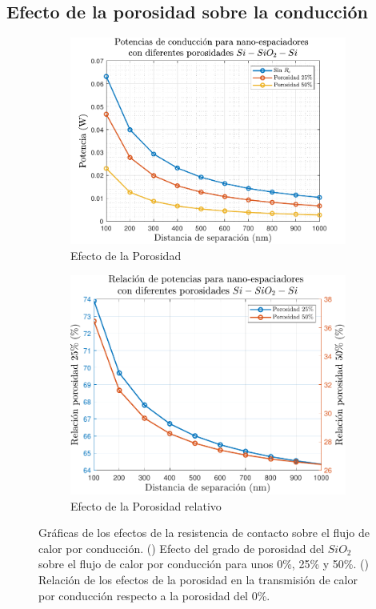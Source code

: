 \subsection{Efecto de la porosidad sobre la conducción}
\begin{figure}[H]
\centering
	\begin{subfigure}[b]{0.49\textwidth}
		\centering
		\includegraphics[width=1.0\textwidth]{figuras/Resultados/conduccion/pdf/Ppor_SiSiO2Si.pdf}
		\caption{Efecto de la Porosidad}
		\label{fig:Ppor_SiSiO2Si}
	\end{subfigure}
	\hfill
	\begin{subfigure}[b]{0.49\textwidth}
		\centering
		\includegraphics[width=1.0\textwidth]{figuras/Resultados/conduccion/pdf/relPpor_SiSiO2Si.pdf}
		\caption{Efecto de la Porosidad relativo}
		\label{fig:relPpor_SiSiO2Si}
	\end{subfigure}
	\caption[Efectos de la porosidad del nano-espaciador sobre el flujo de calor por conducción]{Gráficas de los efectos de la resistencia de contacto sobre el flujo de calor por conducción. () Efecto del grado de porosidad del $SiO_2$ sobre el flujo de calor por conducción para unos 0\%, 25\% y 50\%. () Relación de los efectos de la porosidad en la transmisión de calor por conducción respecto a la porosidad del 0\%.}
	\label{fig:PcondPor_SiSiO2Si}
\end{figure}
